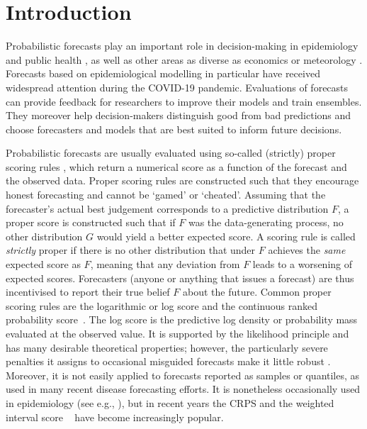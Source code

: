 \documentclass{article}
\begin{document}
\newpage


\section{Introduction}

Probabilistic forecasts \citep{heldProbabilisticForecastingInfectious2017} play an important role in decision-making in epidemiology and public health \citep{doi:10.2105/AJPH.2022.306831}, as well as other areas as diverse as economics \citep{timmermannForecastingMethodsFinance2018} or meteorology \citep{gneitingWeatherForecastingEnsemble2005}. Forecasts based on epidemiological modelling in particular have received widespread attention during the COVID-19 pandemic. Evaluations of forecasts can provide feedback for researchers to improve their models and train ensembles. They moreover help decision-makers distinguish good from bad predictions and choose forecasters and models that are best suited to inform future decisions.

Probabilistic forecasts are usually evaluated using so-called (strictly) proper scoring rules \citep{gneitingStrictlyProperScoring2007}, which return a numerical score as a function of the forecast and the observed data. 
Proper scoring rules are constructed such that they encourage honest forecasting and cannot be `gamed' or `cheated'. 
Assuming that the forecaster's actual best judgement corresponds to a predictive distribution $F$, a proper score is constructed such that if $F$ was the data-generating process, no other distribution $G$ would yield a better expected score. A scoring rule is called \textit{strictly} proper if there is no other distribution that under $F$ achieves the \textit{same} expected score as $F$, meaning that any deviation from $F$ leads to a worsening of expected scores. Forecasters (anyone or anything that issues a forecast) are thus incentivised to report their true belief $F$ about the future. 
Common proper scoring rules are the logarithmic or log score \citep{goodRationalDecisions1952} and the continuous ranked probability score~\citep[CRPS,][]{gneitingStrictlyProperScoring2007}. The log score is the predictive log density or probability mass evaluated at the observed value. It is supported by the likelihood principle \citep{Winkler1996} and has many desirable theoretical properties; however, the particularly severe penalties it assigns to occasional misguided forecasts make it little robust \citep{bracherEvaluatingEpidemicForecasts2021}. Moreover, it is not easily applied to forecasts reported as samples or quantiles, as used in many recent disease forecasting efforts. It is nonetheless occasionally used in epidemiology (see e.g., \citealt{heldProbabilisticForecastingInfectious2017, Johansson2019}), but in recent years the CRPS and the weighted interval score ~\citep[WIS,][]{bracherEvaluatingEpidemicForecasts2021} have become increasingly popular. 
\end{document}
